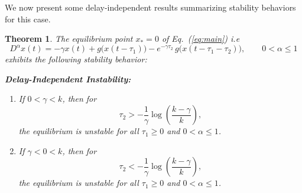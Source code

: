 \documentclass[11pt]{article}
\newtheorem{theorem}{Theorem}[section]
\theoremstyle{remark}
\begin{document}
	
	We now present some delay-independent results summarizing stability behaviors for this case.
\begin{theorem}
	\label{thmcase2_unified}
	The equilibrium point $x_* = 0$ of Eq.~(\ref{eq:main}) i.e 
		\begin{equation}
		D^{\alpha} x(t)
		= -\gamma x(t)
		+ g\big(x(t - \tau_1)\big)
		- e^{-\gamma \tau_2}\, g\big(x(t - \tau_1 - \tau_2)\big),
		\qquad 0 < \alpha \le 1
	\end{equation}
	 exhibits the following stability behavior:
	
	\textbf{Delay-Independent Instability:}
	\begin{enumerate}[label=(\roman*)]
		\item If $0 < \gamma < k$, then for 
		\[
		\tau_2 > -\frac{1}{\gamma} \log\left(\frac{k - \gamma}{k}\right),
		\]
		the equilibrium is unstable for all $\tau_1 \ge 0$ and $0 < \alpha \le 1$.
		
		\item If $\gamma < 0 < k$, then for 
		\[
		\tau_2 < -\frac{1}{\gamma} \log\left(\frac{k - \gamma}{k}\right),
		\]
		the equilibrium is unstable for all $\tau_1 \ge 0$ and $0 < \alpha \le 1$.
	\end{enumerate}
	
\end{theorem}
\end{document}
